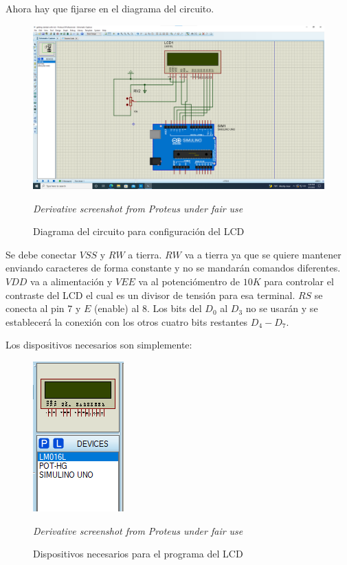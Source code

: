 \documentclass{article}
\begin{document}
    \bigbreak

    Ahora hay que fijarse en el diagrama del circuito.

    \begin{figure}[H]
        \centering
        \includegraphics[width=0.6\paperwidth]{images/sim-schematic.png}
        \caption{Diagrama del circuito para configuración del LCD}\footnotesize
        \textit{Derivative screenshot from Proteus under fair use}
    \end{figure}

    Se debe conectar $VSS$ y $RW$ a tierra. $RW$ va a tierra ya que se quiere mantener enviando caracteres de forma constante y no se mandarán comandos diferentes. $VDD$ va a alimentación y $VEE$ va al potenciómentro de $10K$ para controlar el contraste del LCD el cual es un divisor de tensión para esa terminal. $RS$ se conecta al pin $7$ y $E$ (enable) al $8$. Los bits del $D_0$ al $D_3$ no se usarán y se establecerá la conexión con los otros cuatro bits restantes $D_4-D_7$.

    \bigbreak

    Los dispositivos necesarios son simplemente:

    \begin{figure}[H]
        \centering
        \includegraphics[width=0.2\paperwidth]{images/sim-devices.png}
        \caption{Dispositivos necesarios para el programa del LCD}\footnotesize
        \textit{Derivative screenshot from Proteus under fair use}
    \end{figure}
\end{document}

